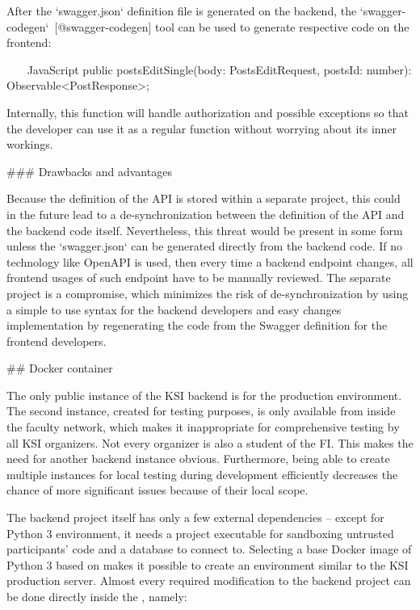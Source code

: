 \documentclass[
  digital, %
  oneside, %
  lof,     %
  nolot,     %
]{fithesis4}
\begin{document}
{After the `swagger.json` definition file is generated on the backend, the `swagger-codegen`~[@swagger-codegen] tool can be used to generate respective code on the frontend:

~~~ JavaScript
public postsEditSingle(body: PostsEditRequest, postsId: number): Observable<PostResponse>;
~~~

Internally, this function will handle authorization and possible exceptions so that the developer can use it as a regular function without worrying about its inner workings.

### Drawbacks and advantages

Because the definition of the API is stored within a separate project, this could in the future lead to a de-synchronization between the definition of the API and the backend code itself. Nevertheless, this threat would be present in some form unless the `swagger.json` can be generated directly from the backend code. If no technology like OpenAPI is used, then every time a backend endpoint changes, all frontend usages of such endpoint have to be manually reviewed. The separate project is a compromise, which minimizes the risk of de-synchronization by using a simple to use syntax for the backend developers and easy changes implementation by regenerating the code from the Swagger definition for the frontend developers.

## Docker container

The only public instance of the KSI backend is for the production environment. The second instance, created for testing purposes, is only available from inside the faculty network, which makes it inappropriate for comprehensive testing by all KSI organizers. Not every organizer is also a student of the FI. This makes the need for another backend instance obvious. Furthermore, being able to create multiple instances for local testing during development efficiently decreases the chance of more significant issues because of their local scope.

The backend project itself has only a few external dependencies -- except for Python 3 environment, it needs a  project executable for sandboxing untrusted participants' code and a database to connect to. Selecting a base Docker image of Python 3 based on  makes it possible to create an environment similar to the KSI production server. Almost every required modification to the backend project can be done directly inside the , namely:

}
\end{document}
